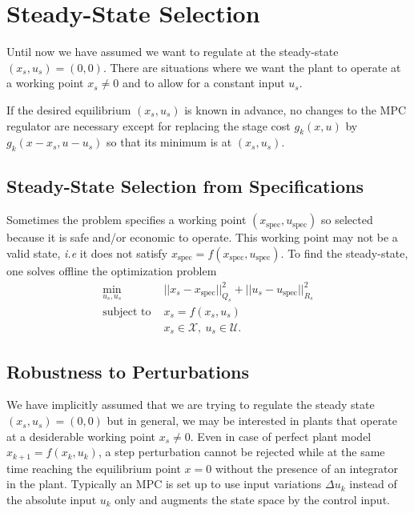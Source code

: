 \section{Steady-State Selection}
\label{sec:steady-state-selection}

Until now we have assumed we want to regulate at the steady-state $(x_s,u_s) = (0,0)$. There are situations where we want the plant to operate at a working point $x_s\neq 0$ and to allow for a constant input $u_s$.

If the desired equilibrium $(x_s, u_s)$ is known in advance, no changes to the MPC regulator are necessary except for replacing the stage cost $g_k(x,u)$ by $g_k(x-x_s,u-u_s)$ so that its minimum is at $(x_s,u_s)$.

\subsection{Steady-State Selection from Specifications}
\label{sec:steady-state-from-specs}

Sometimes the problem specifies a working point $(x_\text{spec},u_\text{spec})$ so selected because it is safe and/or economic to operate. This working point may not be a valid state, \textit{i.e} it does not satisfy $x_\text{spec} = f(x_\text{spec},u_\text{spec})$. To find the steady-state, one solves offline the optimization problem
\begin{align*}
  \min_{u_s,u_s} & ||x_s-x_\text{spec}||_{Q_s}^2 + ||u_s-u_\text{spec}||_{R_s}^2 \\
  \text{subject to } & x_s = f(x_s,u_s) \\
                 & x_s \in \mathcal{X},\ u_s \in \mathcal{U}.
\end{align*}


\subsection{Robustness to Perturbations}
\label{sec:robustness-to-perturbations}

We have implicitly assumed that we are trying to regulate the steady state $(x_s,u_s) = (0,0)$ but in general, we may be interested in plants that operate at a desiderable working point $x_s\neq 0$. Even in case of perfect plant model $x_{k+1} = f(x_k,u_k)$, a step perturbation cannot be rejected while at the same time reaching the equilibrium point $x=0$ without the presence of an integrator in the plant. Typically an MPC is set up to use input variations $\Delta u_k$ instead of the absolute input $u_k$ only and augments the state space by the control input.

